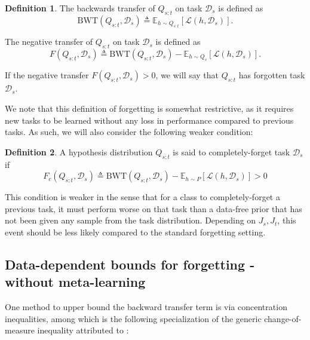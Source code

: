 \documentclass[letterpaper]{article}
\theoremstyle{definition}
\newtheorem{defn}{Definition}[section]
\begin{document}
\begin{defn}
	The backwards transfer of $Q_{s:t}$ on task $\mathcal{D}_s$ is defined as $$\mathrm{BWT}(Q_{s:t}, \mathcal{D}_s) \triangleq \mathbb{E}_{h\sim Q_{s:t}}\left [\mathcal{L}(h, \mathcal{D}_s)\right ].$$
	
	The negative transfer of $Q_{s:t}$ on task $\mathcal{D}_s$ is defined as $$F(Q_{s:t}, \mathcal{D}_s) \triangleq \mathrm{BWT}(Q_{s:t}, \mathcal{D}_s) - \mathbb{E}_{h\sim Q_{s}}\left [\mathcal{L}(h, \mathcal{D}_s)\right ].$$
	
	If the negative transfer $F(Q_{s:t}, \mathcal{D}_s)>0$, we will say that $Q_{s:t}$ has forgotten task $\mathcal{D}_s$.
\end{defn}

We note that this definition of forgetting is somewhat restrictive, as it requires new tasks to be learned without any loss in performance compared to previous tasks. As such, we will also consider the following weaker condition:

\begin{defn}
	A hypothesis distribution $Q_{s:t}$ is said to completely-forget task $\mathcal{D}_s$ if
	$$F_c(Q_{s:t}, \mathcal{D}_s)\triangleq\mathrm{BWT}(Q_{s:t}, \mathcal{D}_s) - \mathbb{E}_{h\sim P}\left [\mathcal{L}(h, \mathcal{D}_s)\right ]>0$$
\end{defn}

This condition is weaker in the sense that for a class to completely-forget a previous task, it must perform worse on that task than a data-free prior that has not been given any sample from the task distribution. Depending on $J_s,J_t$, this event should be less likely compared to the standard forgetting setting.

\subsection{Data-dependent bounds for forgetting - without meta-learning}

One method to upper bound the backward transfer term is via concentration inequalities, among which is the following specialization of the generic change-of-measure inequality attributed to \citet{donsker1975large}:
\end{document}
